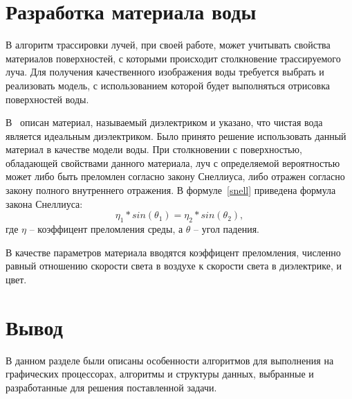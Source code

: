 \section{Разработка материала воды}

В алгоритм трассировки лучей, при своей работе, может учитывать 
свойства материалов поверхностей, с которыми происходит столкновение 
трассируемого луча. Для получения качественного изображения воды требуется выбрать 
и реализовать модель, с использованием которой будет выполняться отрисовка 
поверхностей воды.

В~\cite{RTW} описан материал, называемый диэлектриком и указано, что
чистая вода является идеальным диэлектриком. Было принято решение использовать
данный материал в качестве модели воды. При столкновении с поверхностью, обладающей
свойствами данного материала, луч с определяемой вероятностью может
либо быть преломлен согласно закону Снеллиуса, либо отражен согласно закону 
полного внутреннего отражения. В формуле~\ref{snell} приведена формула закона
Снеллиуса:
\begin{equation}
    \label{snell}
    \eta_1 * sin(\theta_1) = \eta_2 * sin(\theta_2),
\end{equation}
где $\eta$ -- коэффицент преломления среды, а $\theta$ -- угол падения. 

В качестве параметров материала вводятся коэффицент преломления, численно равный 
отношению скорости света в воздухе к скорости света в диэлектрике, и цвет. 

\section*{Вывод}

В данном разделе были описаны особенности алгоритмов для выполнения
на графических процессорах, алгоритмы и структуры данных, выбранные 
и разработанные для решения поставленной задачи. 
